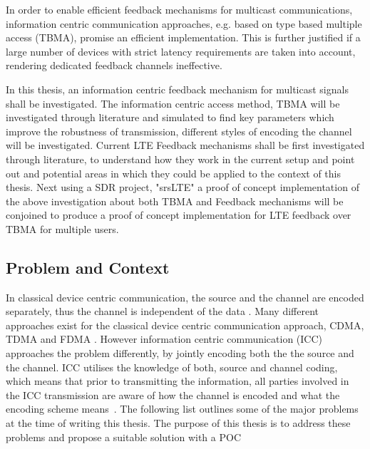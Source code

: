 \documentclass{article}
\begin{document}
In order to enable efficient feedback mechanisms for multicast communications, information centric communication approaches, e.g. based on type based multiple access (TBMA)\cite{tbma}, promise an efficient implementation. This is further justified if a large number of devices with strict latency requirements are taken into account, rendering dedicated feedback channels ineffective. 

In this thesis, an information centric feedback mechanism for multicast signals shall be investigated. The information centric access method, \ac{TBMA}  will be investigated through literature and simulated to find key parameters which improve the robustness of transmission, different styles of encoding the channel will be investigated. 
Current LTE Feedback mechanisms shall be first investigated through literature, to understand how they work in the current setup and point out and potential areas in which they could be applied to the context of this thesis. Next using a SDR project, "srsLTE" a proof of concept implementation of the above investigation about both \ac{TBMA} and Feedback mechanisms will be conjoined to produce a proof of concept implementation for LTE feedback over TBMA for multiple users. 


\subsection{Problem and Context}\label{prob_context}
In classical device centric communication, the source and the channel are encoded separately, thus the channel is independent of the data \cite{shannon_theory}. Many different approaches exist for the classical device centric communication approach, CDMA, TDMA and FDMA \cite{multiple_access_protocols}.  However information centric communication (ICC) approaches the problem differently, by jointly encoding both the the source and the channel. ICC utilises the knowledge of both, source  and channel coding, which means that prior to transmitting the information, all parties involved in the ICC transmission are aware of how the channel is encoded and what the encoding scheme means~\cite{information_centric}. The following list outlines some of the major problems at the time of writing this thesis. The purpose of this thesis is to address these problems and propose a suitable solution with a \ac{POC}  
\end{document}
